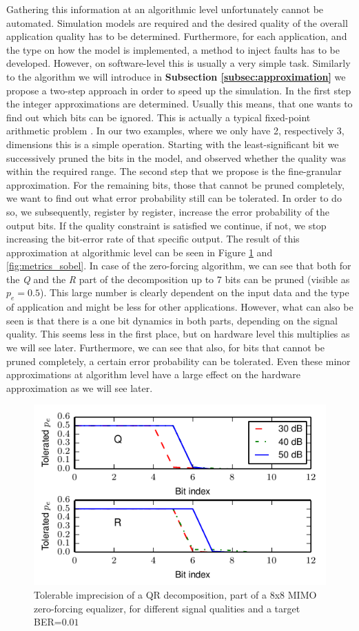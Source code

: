 \documentclass[10pt,twocolumn]{IEEEtran} %
\begin{document}
Gathering this information at an algorithmic level unfortunately cannot be automated. Simulation models are required and the desired quality of the overall application quality has to be determined. Furthermore, for each application, and the type on how the model is implemented, a method to inject faults has to be developed. However, on software-level this is usually a very simple task. Similarly to the algorithm we will introduce in {\bf Subsection \ref{subsec:approximation}} we propose a two-step approach in order to speed up the simulation. In the first step the integer approximations are determined. Usually this means, that one wants to find out which bits can be ignored. This is actually a typical fixed-point arithmetic problem \cite{yates2009fixed}. In our two examples, where we only have 2, respectively 3, dimensions this is a simple operation. Starting with the least-significant bit we successively pruned the bits in the model, and observed whether the quality was within the required range. The second step that we propose is the fine-granular approximation. For the remaining bits, those that cannot be pruned completely, we want to find out what error probability still can be tolerated. In order to do so, we subsequently, register by register, increase the error probability of the output bits. If the quality constraint is satisfied we continue, if not, we stop increasing the bit-error rate of that specific output. The result of this approximation at algorithmic level can be seen in Figure \ref{fig:metrics_qr} and \ref{fig:metrics_sobel}. In case of the zero-forcing algorithm, we can see that both for the \emph{Q} and the \emph{R} part of the decomposition up to 7 bits can be pruned (visible as $p_e=0.5$). This large number is clearly dependent on the input data and the type of application and might be less for other applications. However, what can also be seen is that there is a one bit dynamics in both parts, depending on the signal quality. This seems less in the first place, but on hardware level this multiplies as we will see later. Furthermore, we can see that also, for bits that cannot be pruned completely, a certain error probability can be tolerated. Even these minor approximations at algorithm level have a large effect on the hardware approximation as we will see later.
\begin{figure}[tb]
  \centering
  \includegraphics[width=.48\textwidth]{figs/metrics_qr}
  \caption{Tolerable imprecision of a QR decomposition, part of a 8x8 MIMO zero-forcing equalizer, for different signal qualities and a target BER=$0.01$}
  \label{fig:metrics_qr}
\end{figure}
\end{document}
